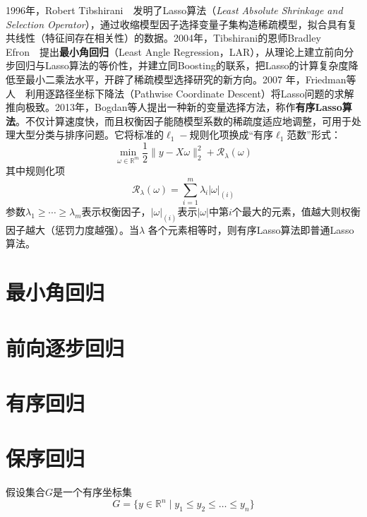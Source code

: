 1996年，Robert Tibshirani~\cite{tibshirani1996regression}~发明了Lasso算法（\textit{Least Absolute Shrinkage and Selection Operator}），通过收缩模型因子选择变量子集构造稀疏模型，拟合具有复共线性（特征间存在相关性）的数据。2004年，Tibshirani的恩师Bradley Efron~\cite{efron2004least}~提出\textbf{最小角回归}（Least Angle Regression，LAR），从理论上建立前向分步回归与Lasso算法的等价性，并建立同Boosting的联系，把Lasso的计算复杂度降低至最小二乘法水平，开辟了稀疏模型选择研究的新方向。2007 年，Friedman等人~\cite{friedman2007pathwise}~利用逐路径坐标下降法（Pathwise Coordinate Descent）将Lasso问题的求解推向极致。2013年，Bogdan等人\cite{bogdan2013statistical}提出一种新的变量选择方法，称作\textbf{有序Lasso算法}。不仅计算速度快，而且权衡因子能随模型系数的稀疏度适应地调整，可用于处理大型分类与排序问题。它将标准的$\ell_1-$规则化项换成“有序$\ell_1$范数”形式：
\begin{equation}
  \min\limits_{\omega\in \mathbb R^m} \frac{1}{2}\|y-X\omega\|_2^2 + \mathcal R_{\lambda}(\omega)
\end{equation}
其中规则化项
\begin{equation}
    \mathcal R_{\lambda}(\omega)=\sum\limits_{i=1}^m \lambda_i |\omega|_{(i)}
\end{equation}
参数$\lambda_1\ge\cdots\ge\lambda_m$表示权衡因子，$|\omega|_{(i)}$表示$|\omega|$中第$i$个最大的元素，值越大则权衡因子越大（惩罚力度越强）。当$\lambda$ 各个元素相等时，则有序Lasso算法即普通Lasso算法。

\section{最小角回归}

\section{前向逐步回归}%

\section{有序回归}%

\section{保序回归}
假设集合$G$是一个有序坐标集
\begin{equation}
   G = \{y\in \mathbb{R}^n \mid y_1 \le y_2 \le \ldots \le y_n\}
\end{equation}

